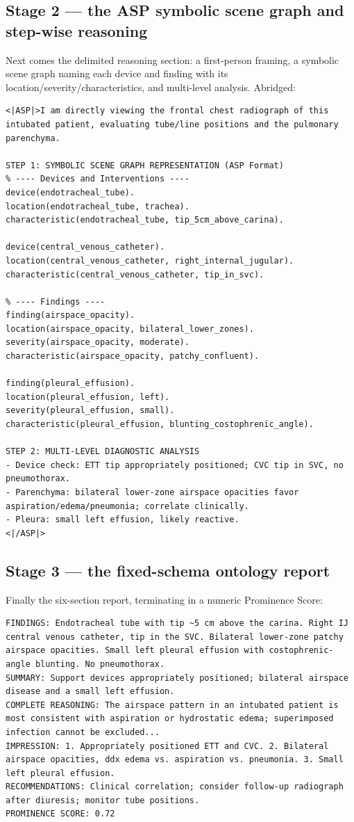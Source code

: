 \documentclass[11pt,a4paper]{article}
\begin{document}
\subsection{Stage 2 --- the ASP symbolic scene graph and step-wise reasoning}
Next comes the delimited reasoning section: a first-person framing, a symbolic scene graph naming each device and finding with its location/severity/characteristics, and multi-level analysis. Abridged:
\begin{lstlisting}
<|ASP|>I am directly viewing the frontal chest radiograph of this intubated patient, evaluating tube/line positions and the pulmonary parenchyma.

STEP 1: SYMBOLIC SCENE GRAPH REPRESENTATION (ASP Format)
% ---- Devices and Interventions ----
device(endotracheal_tube).
location(endotracheal_tube, trachea).
characteristic(endotracheal_tube, tip_5cm_above_carina).

device(central_venous_catheter).
location(central_venous_catheter, right_internal_jugular).
characteristic(central_venous_catheter, tip_in_svc).

% ---- Findings ----
finding(airspace_opacity).
location(airspace_opacity, bilateral_lower_zones).
severity(airspace_opacity, moderate).
characteristic(airspace_opacity, patchy_confluent).

finding(pleural_effusion).
location(pleural_effusion, left).
severity(pleural_effusion, small).
characteristic(pleural_effusion, blunting_costophrenic_angle).

STEP 2: MULTI-LEVEL DIAGNOSTIC ANALYSIS
- Device check: ETT tip appropriately positioned; CVC tip in SVC, no pneumothorax.
- Parenchyma: bilateral lower-zone airspace opacities favor aspiration/edema/pneumonia; correlate clinically.
- Pleura: small left effusion, likely reactive.
<|/ASP|>
\end{lstlisting}

\subsection{Stage 3 --- the fixed-schema ontology report}
Finally the six-section report, terminating in a numeric Prominence Score:
\begin{lstlisting}
FINDINGS: Endotracheal tube with tip ~5 cm above the carina. Right IJ central venous catheter, tip in the SVC. Bilateral lower-zone patchy airspace opacities. Small left pleural effusion with costophrenic-angle blunting. No pneumothorax.
SUMMARY: Support devices appropriately positioned; bilateral airspace disease and a small left effusion.
COMPLETE REASONING: The airspace pattern in an intubated patient is most consistent with aspiration or hydrostatic edema; superimposed infection cannot be excluded...
IMPRESSION: 1. Appropriately positioned ETT and CVC. 2. Bilateral airspace opacities, ddx edema vs. aspiration vs. pneumonia. 3. Small left pleural effusion.
RECOMMENDATIONS: Clinical correlation; consider follow-up radiograph after diuresis; monitor tube positions.
PROMINENCE SCORE: 0.72
\end{lstlisting}
\end{document}
